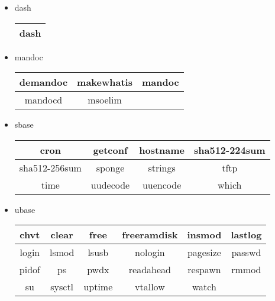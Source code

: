 \begin{itemize}
    \item dash
        \begin{center}
            \begin{tabular}{|c|}
                \hline
                dash \\
                \hline
            \end{tabular}
        \end{center}
    \item mandoc
        \begin{center}
            \begin{tabular}{|c|c|c|}
                \hline
                demandoc & makewhatis & mandoc \\
                \hline
                mandocd & msoelim \\
                \cline{1-2}
            \end{tabular}
        \end{center}
    \item sbase
        \begin{center}
            \begin{tabular}{|c|c|c|c|}
                \hline
                cron & getconf & hostname & sha512-224sum \\
                \hline
                sha512-256sum & sponge & strings & tftp \\
                \hline
                time & uudecode & uuencode & which \\
                \hline
            \end{tabular}
        \end{center}
    \item ubase
        \begin{center}
            \begin{tabular}{|c|c|c|c|c|c|}
                \hline
                chvt & clear & free & freeramdisk & insmod & lastlog \\
                \hline
                login & lsmod & lsusb & nologin & pagesize & passwd \\
                \hline
                pidof & ps & pwdx & readahead & respawn & rmmod \\
                \hline
                su & sysctl & uptime & vtallow & watch \\
                \cline{1-5}
            \end{tabular}
        \end{center}
\end{itemize}
